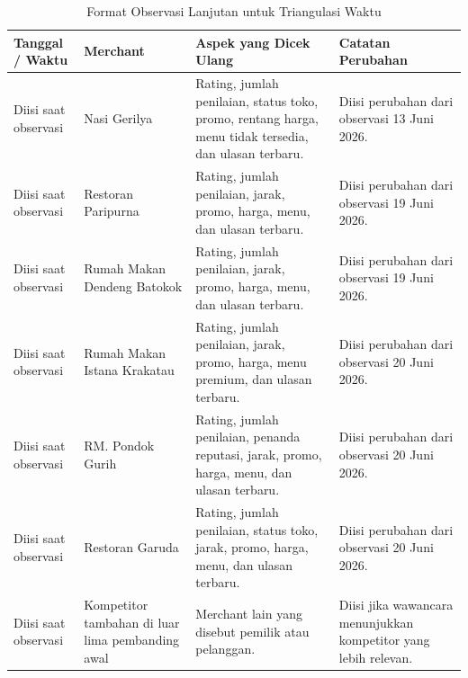 \begin{table}[!htbp]
    \centering
    \caption{Format Observasi Lanjutan untuk Triangulasi Waktu}
    \label{tab:format-observasi-lanjutan-grabfood}
    \footnotesize
    \setlength{\tabcolsep}{3pt}
    \renewcommand{\arraystretch}{0.95}
    \begin{tabularx}{\textwidth}{|Z{2.2cm}|Y|Y|Y|}
        \toprule
        \textbf{Tanggal / Waktu} & \textbf{Merchant} & \textbf{Aspek yang Dicek Ulang} & \textbf{Catatan Perubahan} \\ \hline
        \midrule
        Diisi saat observasi & Nasi Gerilya & Rating, jumlah penilaian, status toko, promo, rentang harga, menu tidak tersedia, dan ulasan terbaru. & Diisi perubahan dari observasi 13 Juni 2026. \\ \hline
        Diisi saat observasi & Restoran Paripurna & Rating, jumlah penilaian, jarak, promo, harga, menu, dan ulasan terbaru. & Diisi perubahan dari observasi 19 Juni 2026. \\ \hline
        Diisi saat observasi & Rumah Makan Dendeng Batokok & Rating, jumlah penilaian, jarak, promo, harga, menu, dan ulasan terbaru. & Diisi perubahan dari observasi 19 Juni 2026. \\ \hline
        Diisi saat observasi & Rumah Makan Istana Krakatau & Rating, jumlah penilaian, jarak, promo, harga, menu premium, dan ulasan terbaru. & Diisi perubahan dari observasi 20 Juni 2026. \\ \hline
        Diisi saat observasi & RM. Pondok Gurih & Rating, jumlah penilaian, penanda reputasi, jarak, promo, harga, menu, dan ulasan terbaru. & Diisi perubahan dari observasi 20 Juni 2026. \\ \hline
        Diisi saat observasi & Restoran Garuda & Rating, jumlah penilaian, status toko, jarak, promo, harga, menu, dan ulasan terbaru. & Diisi perubahan dari observasi 20 Juni 2026. \\ \hline
        Diisi saat observasi & Kompetitor tambahan di luar lima pembanding awal & Merchant lain yang disebut pemilik atau pelanggan. & Diisi jika wawancara menunjukkan kompetitor yang lebih relevan. \\ \hline
        \bottomrule
    \end{tabularx}
\end{table}
